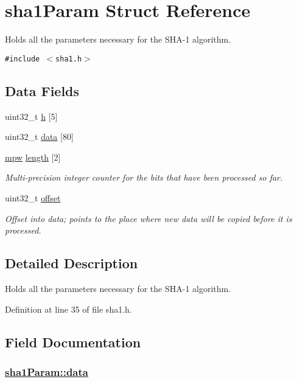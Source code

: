 \hypertarget{structsha1Param}{
\section{sha1Param Struct Reference}
\label{structsha1Param}
}
Holds all the parameters necessary for the SHA-1 algorithm.  


{\tt \#include $<$sha1.h$>$}

\subsection*{Data Fields}
\begin{CompactItemize}
\item 
uint32\_\-t \hyperlink{structsha1Param_o0}{h} \mbox{[}5\mbox{]}
\item 
uint32\_\-t \hyperlink{structsha1Param_o1}{data} \mbox{[}80\mbox{]}
\item 
\hyperlink{beecrypt_8api_8h_a9}{mpw} \hyperlink{structsha1Param_o2}{length} \mbox{[}2\mbox{]}
\begin{CompactList}\small\item\em Multi-precision integer counter for the bits that have been processed so far. \item\end{CompactList}\item 
uint32\_\-t \hyperlink{structsha1Param_o3}{offset}
\begin{CompactList}\small\item\em Offset into {\em data\/}; points to the place where new data will be copied before it is processed. \item\end{CompactList}\end{CompactItemize}


\subsection{Detailed Description}
Holds all the parameters necessary for the SHA-1 algorithm. 

Definition at line 35 of file sha1.h.

\subsection{Field Documentation}
\hypertarget{structsha1Param_o1}{
\subsubsection[data]{\setlength{\rightskip}{0pt plus 5cm}\hyperlink{structsha1Param_o1}{sha1Param::data}}}
\label{structsha1Param_o1}


